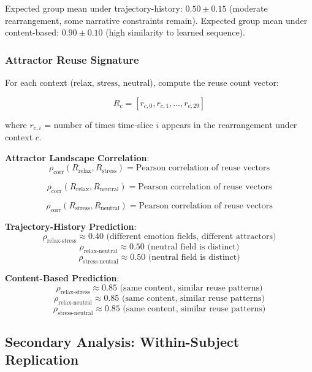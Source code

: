 \documentclass[12pt,a4paper]{article}
\theoremstyle{definition}
\begin{document}
Expected group mean under trajectory-history: $0.50 \pm 0.15$ (moderate rearrangement, some narrative constraints remain).
Expected group mean under content-based: $0.90 \pm 0.10$ (high similarity to learned sequence).

\subsubsection{Attractor Reuse Signature}

For each context ($\text{relax}$, $\text{stress}$, $\text{neutral}$), compute the reuse count vector:

\begin{equation}
R_c = [r_{c,0}, r_{c,1}, \ldots, r_{c,29}]
\end{equation}

where $r_{c,i}$ = number of times time-slice $i$ appears in the rearrangement under context $c$.

\textbf{Attractor Landscape Correlation}:
\begin{equation}
\rho_{\text{corr}}(R_{\text{relax}}, R_{\text{stress}}) = \text{Pearson correlation of reuse vectors}
\end{equation}

\begin{equation}
\rho_{\text{corr}}(R_{\text{relax}}, R_{\text{neutral}}) = \text{Pearson correlation of reuse vectors}
\end{equation}

\begin{equation}
\rho_{\text{corr}}(R_{\text{stress}}, R_{\text{neutral}}) = \text{Pearson correlation of reuse vectors}
\end{equation}

\textbf{Trajectory-History Prediction}:
$$\rho_{\text{relax-stress}} \approx 0.40 \text{ (different emotion fields, different attractors)}$$
$$\rho_{\text{relax-neutral}} \approx 0.50 \text{ (neutral field is distinct)}$$
$$\rho_{\text{stress-neutral}} \approx 0.50 \text{ (neutral field is distinct)}$$

\textbf{Content-Based Prediction}:
$$\rho_{\text{relax-stress}} \approx 0.85 \text{ (same content, similar reuse patterns)}$$
$$\rho_{\text{relax-neutral}} \approx 0.85 \text{ (same content, similar reuse patterns)}$$
$$\rho_{\text{stress-neutral}} \approx 0.85 \text{ (same content, similar reuse patterns)}$$

\subsection{Secondary Analysis: Within-Subject Replication}
\end{document}
